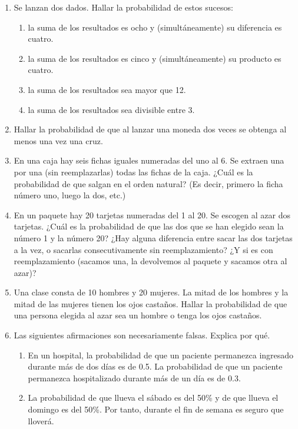 \documentclass[10pt,a4paper]{article}\usepackage[]{graphicx}\usepackage[]{color}
\begin{document}
\begin{enumerate}
  \addtocounter{enumi}{16}

    \item Se lanzan dos dados. Hallar la probabilidad de estos sucesos:
        \begin{enumerate}
            \item la suma de los resultados es ocho y (simultáneamente) su diferencia es cuatro.
            \item la suma de los resultados es cinco y (simultáneamente) su producto es cuatro.
            \item la suma de los resultados sea mayor que 12.
            \item la suma de los resultados sea divisible entre 3.
        \end{enumerate}

    \item Hallar la probabilidad de que al lanzar una moneda dos veces se obtenga al menos una vez una cruz.

    \item En una caja hay seis fichas iguales numeradas del uno al 6. Se extraen una por una (sin reemplazarlas) todas las fichas de la caja. ¿Cuál es la probabilidad de que salgan en el orden natural? (Es decir, primero la ficha número uno, luego la dos, etc.)

    \item En un paquete hay 20 tarjetas numeradas del 1 al 20. Se escogen al azar dos tarjetas. ¿Cuál es la probabilidad de que las dos que se han elegido sean la número 1 y la número 20? ¿Hay alguna diferencia entre sacar las dos tarjetas a la vez, o sacarlas consecutivamente sin reemplazamiento? ¿Y si es con reemplazamiento (sacamos una, la devolvemos al paquete y sacamos otra al azar)?

    \item Una clase consta de 10 hombres y 20 mujeres. La mitad de los hombres y la mitad de las mujeres tienen los ojos castaños. Hallar la probabilidad de que una persona elegida al azar sea un hombre o tenga los ojos castaños.

    \item Las siguientes afirmaciones son necesariamente falsas. Explica por qué.
        \begin{enumerate}
        \item En un hospital, la probabilidad de que un paciente permanezca ingresado durante m\'as de dos d\'ias  es de 0.5. La probabilidad de que un paciente permanezca hospitalizado durante m\'as de un d\'ia es de 0.3.
        \item La probabilidad de que llueva el s\'abado es del 50\% y de que llueva el domingo es del 50\%. Por tanto, durante el fin de semana es seguro que llover\'a.
        \end{enumerate}


\end{enumerate}
\end{document}
